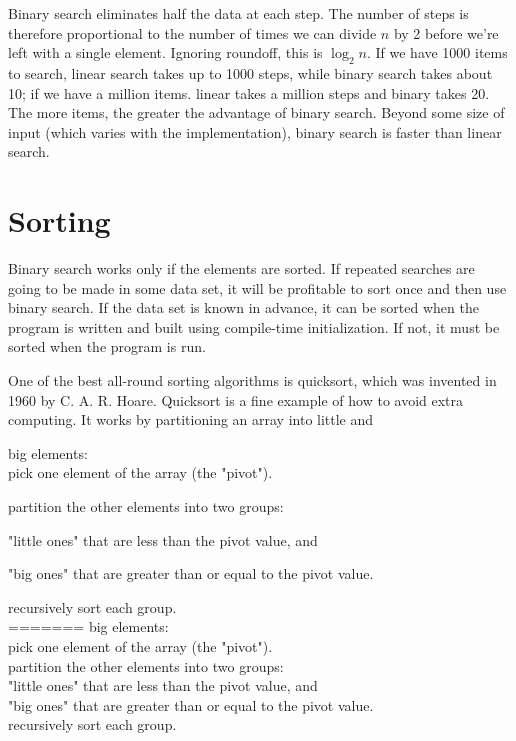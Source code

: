 Binary search eliminates half the data at each step. The number of steps is
therefore proportional to the number of times we can divide $n$ by 2
before we're left with a single element. Ignoring roundoff, this is $\log_2
n$. If we have 1000 items to search, linear search takes up to 1000 steps,
while binary search takes about 10; if we have a million items. linear
takes a million steps and binary takes 20. The more items, the greater the
advantage of binary search. Beyond some size of input (which varies with
the implementation), binary search is faster than linear search.

\section{Sorting}
Binary search works only if the elements are sorted. If repeated searches
are going to be made in some data set, it will be profitable to sort once
and then use binary search. If the data set is known in advance, it can be
sorted when the program is written and built using compile-time
initialization. If not, it must be sorted when the program is run.

One of the best all-round sorting algorithms is quicksort, which was
invented in 1960 by C. A. R. Hoare. Quicksort is a fine example of how to
avoid extra computing. It works by partitioning an array into little and

big elements:\\

\indent pick one element of the array (the "pivot").

\indent partition the other elements into two groups:

\indent \indent "little ones" that are less than the pivot value, and

\indent \indent "big ones" that are greater than or equal to the pivot
value.

\indent recursively sort each group.\\

=======
big elements:                                                           \\
\indent pick one element of the array (the "pivot").                    \\
\indent partition the other elements into two groups:                   \\
\indent \indent "little ones" that are less than the pivot value, and   \\
\indent \indent "big ones" that are greater than or equal to the pivot
value.                                                                  \\
\indent recursively sort each group.                                    \\

